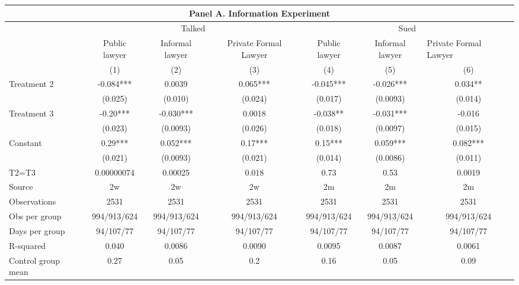 \begin{tabular}{lcccccc}
\toprule
\multicolumn{7}{c}{Panel A. Information Experiment} \\
\midrule
      & \multicolumn{3}{c}{Talked} & \multicolumn{3}{c}{Sued } \\
\midrule
      & Public lawyer & Informal lawyer & Private Formal Lawyer & Public lawyer & Informal lawyer & \multicolumn{1}{l}{Private Formal Lawyer} \\
\midrule
      & (1)   & (2)   & (3)   & (4)   & (5)   & (6) \\
Treatment 2 & -0.084*** & 0.0039 & 0.065*** & -0.045*** & -0.026*** & 0.034** \\
      & (0.025) & (0.010) & (0.024) & (0.017) & (0.0093) & (0.014) \\
Treatment 3 & -0.20*** & -0.030*** & 0.0018 & -0.038** & -0.031*** & -0.016 \\
      & (0.023) & (0.0093) & (0.026) & (0.018) & (0.0097) & (0.015) \\
Constant & 0.29*** & 0.052*** & 0.17*** & 0.15*** & 0.059*** & 0.082*** \\
      & (0.021) & (0.0093) & (0.021) & (0.014) & (0.0086) & (0.011) \\
T2=T3 & 0.00000074 & 0.00025 & 0.018 & 0.73  & 0.53  & 0.0019 \\
\midrule
Source & 2w    & 2w    & 2w    & 2m    & 2m    & 2m \\
Observations & 2531  & 2531  & 2531  & 2531  & 2531  & 2531 \\
Obs per group & 994/913/624 & 994/913/624 & 994/913/624 & 994/913/624 & 994/913/624 & 994/913/624 \\
Days per group & 94/107/77 & 94/107/77 & 94/107/77 & 94/107/77 & 94/107/77 & 94/107/77 \\
R-squared & 0.040 & 0.0086 & 0.0090 & 0.0095 & 0.0087 & 0.0061 \\
Control group mean & 0.27  & 0.05  & 0.2   & 0.16  & 0.05  & 0.09 \\
\bottomrule
\bottomrule
\end{tabular}%
